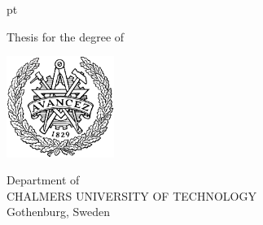 {
 pt
\centering
\thispagestyle{empty}         %


\begin{normalsize}{\uppercase Thesis for the degree of 
}
\end{normalsize}

\vspace{3 cm}

{\large \textbf{\thesistitle} \par}
\vskip 1pc
{\large \thesissubtitle}
\vspace{1.5 cm}
\vspace{-10pt}

{\normalsize \MakeUppercase{\thesisauthor} \par}

\vspace{5 cm}

\includegraphics[width=35mm]{frontmatter/standard-images/chalmers_logo}
\vfill
\vspace{0.5 cm}

Department of \thesisdepartment \\
{\scshape CHALMERS UNIVERSITY OF TECHNOLOGY} \\
Gothenburg, Sweden \thesisyear

\newpage
}
